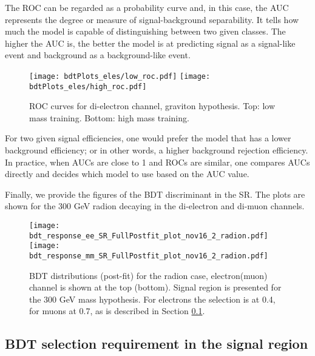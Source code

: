 The ROC can be regarded as a probability curve and, in this case, the AUC represents the degree or measure of signal-background separability. It tells how much the model is capable of distinguishing between two given classes. The higher the AUC is, the better the model is at predicting signal as a signal-like event and background as a background-like event.

\begin{figure}[H]
\begin{center}
\texttt{[image: bdtPlots\_eles/low\_roc.pdf]}
\texttt{[image: bdtPlots\_eles/high\_roc.pdf]}
\caption[ROC curves for di-electron channel, graviton hypothesis.]{ ROC curves for di-electron channel, graviton hypothesis. Top: low mass training. Bottom: high mass training. }
\label{fig:ele_ROCs}
\end{center}
\end{figure}

For two given signal efficiencies, one would prefer the model that has a lower background efficiency; or in other words, a higher background rejection efficiency. In practice, when AUCs are close to 1 and ROCs are similar, one compares AUCs directly and decides which model to use based on the AUC value. 

Finally, we provide the figures of the BDT discriminant in the SR. The plots are shown for the 300 GeV radion decaying in the di-electron and di-muon channels. 

\begin{figure}[H]
\begin{center}
\texttt{[image: bdt\_response\_ee\_SR\_FullPostfit\_plot\_nov16\_2\_radion.pdf]}\\
\texttt{[image: bdt\_response\_mm\_SR\_FullPostfit\_plot\_nov16\_2\_radion.pdf]}\\
\caption[BDT distributions for the radion case.]{ BDT distributions (post-fit) for the radion case, electron(muon) channel is shown at the top (bottom). Signal region is presented for the 300 GeV mass hypothesis. For electrons the selection is at 0.4, for muons at 0.7, as is described in Section \ref{BDT_selection_in_SR}.}
\label{fig:BDTs}
\end{center}
\end{figure}

\subsection{BDT selection requirement in the signal region}
\label{BDT_selection_in_SR}

